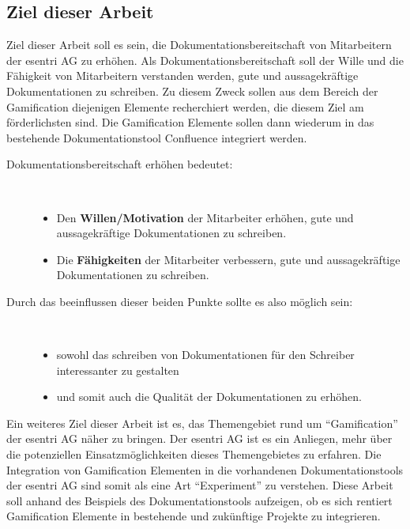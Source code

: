 \documentclass[a4paper,12pt]{scrartcl}
\begin{document}
\subsection{Ziel dieser Arbeit} 
Ziel dieser Arbeit soll es sein, die Dokumentationsbereitschaft von Mitarbeitern der esentri AG zu erhöhen. Als Dokumentationsbereitschaft soll der Wille und die Fähigkeit von Mitarbeitern verstanden werden, gute und aussagekräftige Dokumentationen zu schreiben. Zu diesem Zweck sollen aus dem Bereich der Gamification diejenigen Elemente recherchiert werden, die diesem Ziel am förderlichsten sind. Die Gamification Elemente sollen dann wiederum in das bestehende Dokumentationstool Confluence integriert werden.
\begin{description}
   \item[Dokumentationsbereitschaft erhöhen bedeutet:]~\par
   \begin{itemize}
      \item Den \textbf{Willen/Motivation} der Mitarbeiter erhöhen, gute und aussagekräftige Dokumentationen zu schreiben.  
      \item Die \textbf{Fähigkeiten} der Mitarbeiter verbessern, gute und aussagekräftige Dokumentationen zu schreiben.
   \end{itemize}
\end{description}

\begin{description}
   \item[Durch das beeinflussen dieser beiden Punkte sollte es also möglich sein:]~\par
   \begin{itemize}
      \item sowohl das schreiben von Dokumentationen für den Schreiber interessanter zu gestalten  
      \item und somit auch die Qualität der Dokumentationen zu erhöhen.
   \end{itemize}
\end{description}
Ein weiteres Ziel dieser Arbeit ist es, das Themengebiet rund um “Gamification” der esentri AG näher zu bringen. Der esentri AG ist es ein Anliegen, mehr über die potenziellen Einsatzmöglichkeiten dieses Themengebietes zu erfahren. Die Integration von Gamification Elementen in die vorhandenen Dokumentationstools der esentri AG sind somit als eine Art “Experiment” zu verstehen. Diese Arbeit soll anhand des Beispiels des Dokumentationstools aufzeigen, ob es sich rentiert Gamification Elemente in bestehende und zukünftige Projekte zu integrieren.  
\end{document}
